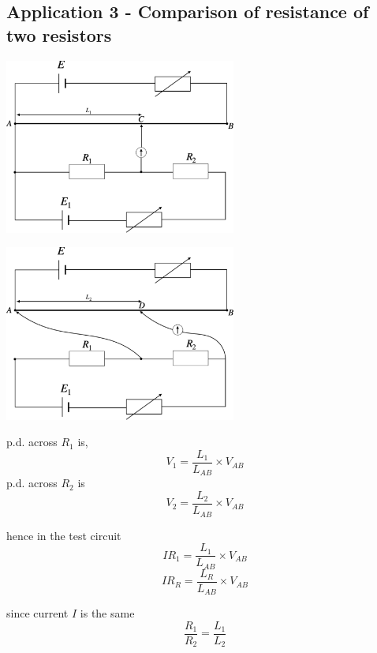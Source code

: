 \documentclass[a4paper, 10pt]{article}
\begin{document}
\subsection{Application 3 - Comparison of resistance of two resistors}
\begin{minipage}{0.5\textwidth}
   \includegraphics[width=3in]{figures/8.pdf} 
\end{minipage}	
\begin{minipage}{0.5\textwidth}
   \includegraphics[width=3in]{figures/9.pdf} 
\end{minipage}	

p.d. across $R_1$ is,
\[
   V_1 = \frac{L_1}{L_{AB}} \times V_{AB}
\]
p.d. across $R_2$ is
\[
   V_2 = \frac{L_2}{L_{AB}} \times V_{AB}
\]

hence in the test circuit
\[
   IR_1 = \frac{L_1}{L_{AB}} \times V_{AB}
\]
\[
   IR_R = \frac{L_R}{L_{AB}} \times V_{AB}
\]

since current $I$ is the same
\[
\frac{R_1}{R_2} = \frac{L_1}{L_2} 
\]
\end{document}
